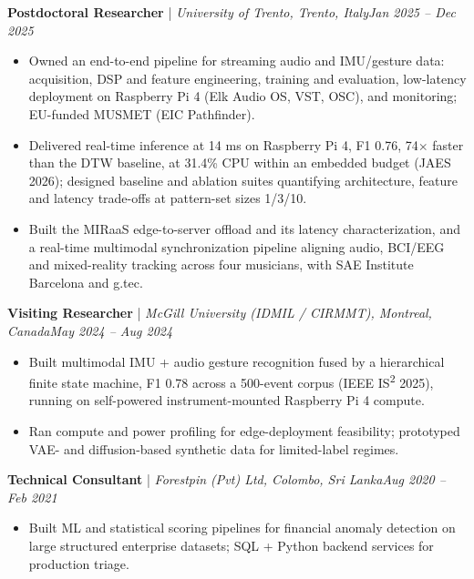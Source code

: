 \documentclass[11pt]{article}
\newenvironment{cvrole}[5]{%
  \par\noindent\textbf{\large #1} | \textit{\small #2, #3}\hfill \textit{\small #4 -- #5}\par
  \begin{itemize}[leftmargin=2em, itemsep=-0.3em, topsep=-0.5em]%
}{%
  \end{itemize}\par\noindent\mbox{}\par\vspace{0.1em}%
}
\begin{document}
\begin{cvrole}{Postdoctoral Researcher}{University of Trento}{Trento, Italy}{Jan 2025}{Dec 2025}
    \item Owned an end-to-end pipeline for streaming audio and IMU/gesture data: acquisition, DSP and feature engineering, training and evaluation, low-latency deployment on Raspberry Pi 4 (Elk Audio OS, VST, OSC), and monitoring; EU-funded MUSMET (EIC Pathfinder).
    \item Delivered real-time inference at 14 ms on Raspberry Pi 4, F1 0.76, 74$\times$ faster than the DTW baseline, at 31.4\% CPU within an embedded budget (JAES 2026); designed baseline and ablation suites quantifying architecture, feature and latency trade-offs at pattern-set sizes 1/3/10.
    \item Built the MIRaaS edge-to-server offload and its latency characterization, and a real-time multimodal synchronization pipeline aligning audio, BCI/EEG and mixed-reality tracking across four musicians, with SAE Institute Barcelona and g.tec.
\end{cvrole}

\begin{cvrole}{Visiting Researcher}{McGill University (IDMIL / CIRMMT)}{Montreal, Canada}{May 2024}{Aug 2024}
    \item Built multimodal IMU + audio gesture recognition fused by a hierarchical finite state machine, F1 0.78 across a 500-event corpus (IEEE IS\textsuperscript{2} 2025), running on self-powered instrument-mounted Raspberry Pi 4 compute.
    \item Ran compute and power profiling for edge-deployment feasibility; prototyped VAE- and diffusion-based synthetic data for limited-label regimes.
\end{cvrole}

\begin{cvrole}{Technical Consultant}{Forestpin (Pvt) Ltd}{Colombo, Sri Lanka}{Aug 2020}{Feb 2021}
    \item Built ML and statistical scoring pipelines for financial anomaly detection on large structured enterprise datasets; SQL + Python backend services for production triage.
\end{cvrole}
\end{document}
